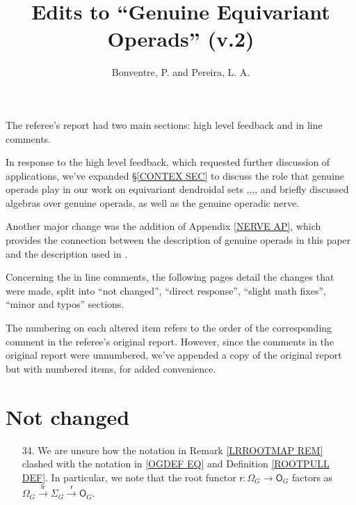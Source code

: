 \documentclass{article}
\begin{document}
 
 
\title{Edits to ``Genuine Equivariant Operads'' (v.2)
\\[12pt]} %
 
\author{Bonventre, P. and Pereira, L. A.}
 
\maketitle
 
The referee's report had two main sections:
high level feedback and in line comments.

In response to the high level feedback,
which requested further discussion of applications,
we've expanded \S \ref{CONTEX SEC}
to discuss the role that genuine operads play
in our work on equivariant dendroidal sets
\cite{Pe17},\cite{BP_edss},\cite{BP_HGOP},\cite{BP_TAS},
and briefly discussed algebras over genuine operads,
as well as the genuine operadic nerve.

Another major change was the addition of Appendix \ref{NERVE AP},
which provides the connection between the description of genuine operads in this paper and the description used in \cite{BP_edss}.


\vskip 10pt

Concerning the in line comments,
the following pages detail the changes that were made,
split into 
``not changed'',
``direct response'',
``slight math fixes'',
``minor and typos''
sections.

The numbering on each altered item refers to the order of the corresponding comment in the referee's original report.
However, since the comments in the original report
were unnumbered, 
we've appended a copy of the original report but with numbered items,
for added convenience. 



\section{Not changed}

\begin{itemize}

\item[34.] We are unsure how the notation in 
Remark \ref{LRROOTMAP REM} clashed with the notation in 
\eqref{OGDEF EQ} and Definition \ref{ROOTPULL DEF}.
In particular, we note that the root functor $\mathsf r \colon \Omega_G \to \mathsf O_G$
factors as
$\Omega_G \xrightarrow{\mathsf{lr}} \Sigma_G \xrightarrow{\mathsf r} \mathsf O_G$.

\end{itemize}
\end{document}

